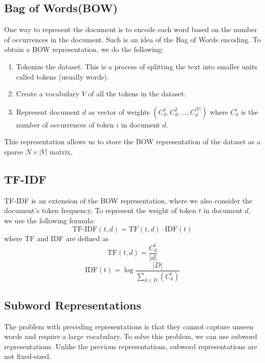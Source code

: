 \subsection{Bag of Words(BOW)}
\label{sec:bow}
One way to represent the document is to encode each word based on the number of occurrences in the document.
Such is an idea of the Bag of Words encoding. To obtain a BOW representation, we do the following:
\begin{enumerate}
    \item Tokenize the dataset. This is a process of splitting the text into smaller units called tokens (usually words).
    \item Create a vocabulary $V$ of all the tokens in the dataset.
    \item Represent document $d$ as vector of weights $(C_{d}^1, C_{d}^2, \dots, C_{d}^{|V|})$ where $C_{d}^i$
    is the number of occurrences of token $i$ in document $d$.
\end{enumerate}
This representation allows us to store the BOW representation of the dataset as a sparse $N \times |V|$ matrix,

\subsection{TF-IDF}
\label{sec:tfidf}
TF-IDF is an extension of the BOW representation, where we also consider the document's token frequency.
To represent the weight of token $t$ in document $d$, we use the following formula:
\begin{equation}
    \label{eq:tfidf}
    \text{TF-IDF}(t, d) = \text{TF}(t, d) \cdot \text{IDF}(t)
\end{equation}
where TF and IDF are defined as
\begin{equation}
    \label{eq:tf}
    \text{TF}(t, d) = \frac{C_{d}^t}{|d|}
\end{equation}
\begin{equation}
    \label{eq:idf}
    \text{IDF}(t) = \log \frac{|D|}{\sum_{d \in D} (C_{d}^t)}
\end{equation}


\subsection{Subword Representations}
    The problem with preceding representations is that they cannot capture unseen words and require
    a large vocabulary. To solve this problem, we can use subword representations. Unlike the previous
    representations, subword representations are not fixed-sized.

